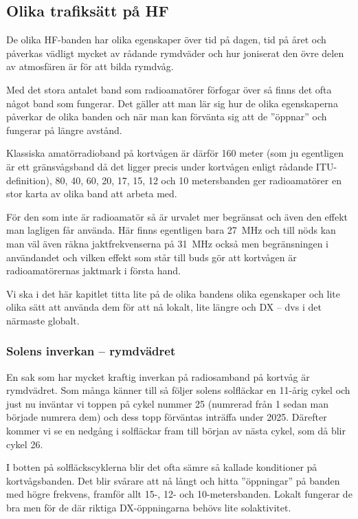 \clearpage

\subsection{Olika trafiksätt på HF}

De olika HF-banden har olika egenskaper över tid på dagen, tid på året och påverkas vädligt mycket av rådande rymdväder och hur joniserat den övre delen av atmosfären är för att bilda rymdvåg.

Med det stora antalet band som radioamatörer förfogar över så finns det ofta något band som fungerar. Det gäller att man lär sig hur de olika egenskaperna påverkar de olika banden och när man kan förvänta sig att de ''öppnar'' och fungerar på längre avstånd.

Klassiska amatörradioband på kortvågen är därför 160 meter (som ju egentligen är ett gränsvågsband då det ligger precis under kortvågen enligt rådande ITU-definition), 80, 40, 60, 20, 17, 15, 12 och 10 metersbanden ger radioamatörer en stor karta av olika band att arbeta med.

För den som inte är radioamatör så är urvalet mer begränsat och även den effekt man lagligen får använda. Här finns egentligen bara 27~MHz och till nöds kan man väl även räkna jaktfrekvenserna på 31~MHz också men begränsningen i användandet och vilken effekt som står till buds gör att kortvågen är radioamatörernas jaktmark i första hand.

Vi ska i det här kapitlet titta lite på de olika bandens olika egenskaper och lite olika sätt att använda dem för att nå lokalt, lite längre och DX -- dvs i det närmaste globalt.

\subsubsection{Solens inverkan -- rymdvädret}

En sak som har mycket kraftig inverkan på radiosamband på kortvåg är rymdvädret. Som många känner till så följer solens solfläckar en 11-årig cykel och just nu inväntar vi toppen på cykel nummer 25 (numrerad från 1 sedan man började numrera dem) och dess topp förväntas inträffa under 2025. Därefter kommer vi se en nedgång i solfläckar fram till början av nästa cykel, som då blir cykel 26. 

I botten på solfläckscyklerna blir det ofta sämre så kallade konditioner på kortvågsbanden. Det blir svårare att nå långt och hitta ''öppningar'' på banden med högre frekvens, framför allt 15-, 12- och 10-metersbanden. Lokalt fungerar de bra men för de där riktiga DX-öppningarna behövs lite solaktivitet.

